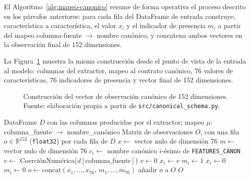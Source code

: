 El Algoritmo~\ref{alg:mapeo-canonico} resume de forma operativa el proceso descrito en los párrafos anteriores: para cada fila del DataFrame de entrada construye, característica a característica, el valor $x_i$ y el indicador de presencia $m_i$ a partir del mapeo columna-fuente $\to$ nombre canónico, y concatena ambos vectores en la observación final de 152 dimensiones.

La Figura~\ref{fig:vector-observacion} muestra la misma construcción desde el punto de vista de la entrada al modelo: columnas del extractor, mapeo al contrato canónico, 76 valores de características, 76 indicadores de presencia y vector final de 152 dimensiones.

\begin{figure}[htbp]
\centering
\resizebox{0.9\textwidth}{!}{}
\caption[Construcción del vector de observación]{Construcción del vector de observación canónico de 152 dimensiones. Fuente: elaboración propia a partir de \texttt{src/canonical\_schema.py}.}
\label{fig:vector-observacion}
\end{figure}

\begin{algorithm}[htbp]
\caption[Mapeo al esquema canónico y construcción de la observación]{Mapeo al esquema canónico y construcción de la observación. Fuente: elaboración propia a partir de \texttt{src/canonical\_schema.py}.}
\label{alg:mapeo-canonico}
\begin{algorithmic}[1]
\Require DataFrame $D$ con las columnas producidas por el extractor; mapeo $\mu$: columna\_fuente $\to$ nombre\_canónico
\Ensure Matriz de observaciones $O$, con una fila $o \in \mathbb{R}^{152}$ (\texttt{float32}) por cada fila de $D$
    \State $x \gets$ vector nulo de dimensión $76$
    \State $m \gets$ vector nulo de dimensión $76$
        \State $c_i \gets$ nombre canónico $i$-ésimo de \texttt{FEATURES\_CANON}
            \State $v \gets$ CoerciónNumérica($d[\text{columna\_fuente}]$) 
                \State $v \gets 0$
            \EndIf
            \State $x_i \gets v$
            \State $m_i \gets 1$ 
        \Else
            \State $x_i \gets 0$ 
            \State $m_i \gets 0$
        \EndIf
    \EndFor
    \State $o \gets \mathrm{concat}(x_1,\dots,x_{76},\, m_1,\dots,m_{76})$ 
    \State añadir $o$ a $O$
\EndFor
\State \Return $O$
\end{algorithmic}
\end{algorithm}


